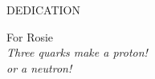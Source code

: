 \newpage
{}

\begin{center}
DEDICATION
\end{center}

\begin{center}
For Rosie\\
\textit{Three quarks make a proton!\\or a neutron!}
\end{center}

